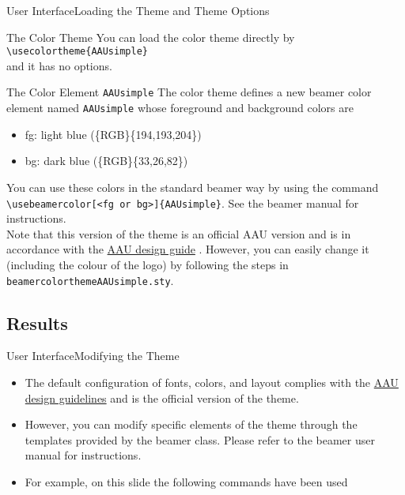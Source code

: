 \documentclass[10pt]{beamer}
\newcommand{\chref}[2]{%
  \href{#1}{{\usebeamercolor[bg]{AAUsimple}#2}}%
}
\begin{document}
\begin{frame}{User Interface}{Loading the Theme and Theme Options}
  \begin{block}{The Color Theme}
    You can load the color theme directly by\\
    {\tt \textbackslash usecolortheme\{AAUsimple\}}\\
    and it has no options.
  \end{block}
  \pause
  \begin{block}{The Color Element {\tt AAUsimple}}
    The color theme defines a new beamer color element named {\tt AAUsimple} whose foreground and background colors are
    \begin{itemize}
      \item fg: {light blue (\{RGB\}\{194,193,204\})}
      \item bg: {dark blue (\{RGB\}\{33,26,82\})}
    \end{itemize}
    You can use these colors in the standard beamer way by using the command
    {\tt \textbackslash usebeamercolor[<fg or bg>]\{AAUsimple\}}. See the beamer manual for instructions.\\
 \pause Note that this version of the theme is an official AAU version and is in accordance with the \chref{http://aau.designguides.dk/}{AAU design guide}. However, you can easily change it (including the colour of the logo) by following the steps in {\tt beamercolorthemeAAUsimple.sty}.
  \end{block}
\end{frame}

\subsection{Results}
{
\begin{frame}{User Interface}{Modifying the Theme}
  \begin{itemize}
    \item<1-> The default configuration of fonts, colors, and layout complies with the \chref{http://aau.designguides.dk}{AAU design guidelines} and is the \alert{official} version of the theme.
    \item<2-> However, you can modify specific elements of the theme through the templates provided by the beamer class. Please refer to the beamer user manual for instructions.
    \item<3-> For example, on this slide the following commands have been used
  \end{itemize}
\end{frame}}
\end{document}
